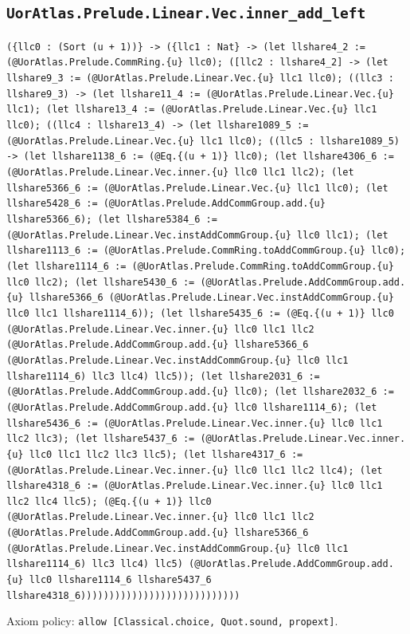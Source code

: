 \documentclass[11pt]{article}
\begin{document}
\subsection*{\texttt{UorAtlas.Prelude.Linear.Vec.inner\_add\_left}}
\noindent\texttt{(\{llc0 : (Sort (u + 1))\} -> (\{llc1 : Nat\} -> (let llshare4\_2 := (@UorAtlas.Prelude.CommRing.\{u\} llc0); ([llc2 : llshare4\_2] -> (let llshare9\_3 := (@UorAtlas.Prelude.Linear.Vec.\{u\} llc1 llc0); ((llc3 : llshare9\_3) -> (let llshare11\_4 := (@UorAtlas.Prelude.Linear.Vec.\{u\} llc1); (let llshare13\_4 := (@UorAtlas.Prelude.Linear.Vec.\{u\} llc1 llc0); ((llc4 : llshare13\_4) -> (let llshare1089\_5 := (@UorAtlas.Prelude.Linear.Vec.\{u\} llc1 llc0); ((llc5 : llshare1089\_5) -> (let llshare1138\_6 := (@Eq.\{(u + 1)\} llc0); (let llshare4306\_6 := (@UorAtlas.Prelude.Linear.Vec.inner.\{u\} llc0 llc1 llc2); (let llshare5366\_6 := (@UorAtlas.Prelude.Linear.Vec.\{u\} llc1 llc0); (let llshare5428\_6 := (@UorAtlas.Prelude.AddCommGroup.add.\{u\} llshare5366\_6); (let llshare5384\_6 := (@UorAtlas.Prelude.Linear.Vec.instAddCommGroup.\{u\} llc0 llc1); (let llshare1113\_6 := (@UorAtlas.Prelude.CommRing.toAddCommGroup.\{u\} llc0); (let llshare1114\_6 := (@UorAtlas.Prelude.CommRing.toAddCommGroup.\{u\} llc0 llc2); (let llshare5430\_6 := (@UorAtlas.Prelude.AddCommGroup.add.\{u\} llshare5366\_6 (@UorAtlas.Prelude.Linear.Vec.instAddCommGroup.\{u\} llc0 llc1 llshare1114\_6)); (let llshare5435\_6 := (@Eq.\{(u + 1)\} llc0 (@UorAtlas.Prelude.Linear.Vec.inner.\{u\} llc0 llc1 llc2 (@UorAtlas.Prelude.AddCommGroup.add.\{u\} llshare5366\_6 (@UorAtlas.Prelude.Linear.Vec.instAddCommGroup.\{u\} llc0 llc1 llshare1114\_6) llc3 llc4) llc5)); (let llshare2031\_6 := (@UorAtlas.Prelude.AddCommGroup.add.\{u\} llc0); (let llshare2032\_6 := (@UorAtlas.Prelude.AddCommGroup.add.\{u\} llc0 llshare1114\_6); (let llshare5436\_6 := (@UorAtlas.Prelude.Linear.Vec.inner.\{u\} llc0 llc1 llc2 llc3); (let llshare5437\_6 := (@UorAtlas.Prelude.Linear.Vec.inner.\{u\} llc0 llc1 llc2 llc3 llc5); (let llshare4317\_6 := (@UorAtlas.Prelude.Linear.Vec.inner.\{u\} llc0 llc1 llc2 llc4); (let llshare4318\_6 := (@UorAtlas.Prelude.Linear.Vec.inner.\{u\} llc0 llc1 llc2 llc4 llc5); (@Eq.\{(u + 1)\} llc0 (@UorAtlas.Prelude.Linear.Vec.inner.\{u\} llc0 llc1 llc2 (@UorAtlas.Prelude.AddCommGroup.add.\{u\} llshare5366\_6 (@UorAtlas.Prelude.Linear.Vec.instAddCommGroup.\{u\} llc0 llc1 llshare1114\_6) llc3 llc4) llc5) (@UorAtlas.Prelude.AddCommGroup.add.\{u\} llc0 llshare1114\_6 llshare5437\_6 llshare4318\_6))))))))))))))))))))))))))))}\par
\noindent Axiom policy: \texttt{allow [Classical.choice, Quot.sound, propext]}.\par
\end{document}
